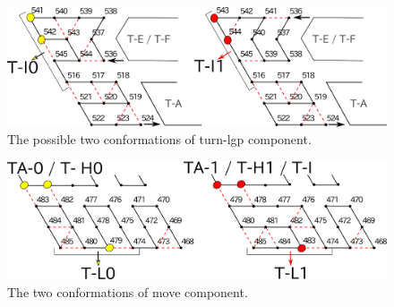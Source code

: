 \documentclass[runningheads]{llncs}
\begin{document}
\begin{figure}[h]
\centering
\includegraphics[width=0.8\linewidth]{pic/turn-lgp.png}
\caption{The possible two conformations of turn-lgp component.}
\label{fig:turn-lgp}
\end{figure}


\begin{figure}[h]
\centering
\includegraphics[width=\linewidth]{pic/move.png}
\caption{The two conformations of move component.}
\label{fig:move}
\end{figure}
\end{document}
